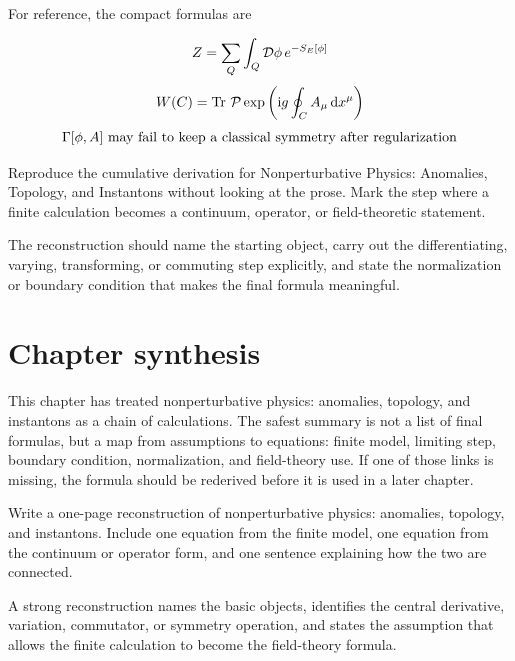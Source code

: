 For reference, the compact formulas are

\[
  Z=\sum_Q\int_Q\mathcal D\phi\,e^{-S_E[\phi]}
\]
\[
  W(C)=\operatorname{Tr}\,\mathcal P\exp\left(\mathrm i g\oint_C A_\mu\,\mathrm d x^\mu\right)
\]
\[
  \Gamma[\phi,A]\hbox{ may fail to keep a classical symmetry after regularization}
\]

\begin{exercise}
Reproduce the cumulative derivation for Nonperturbative Physics: Anomalies, Topology, and Instantons without looking at the prose.  Mark the step where a finite calculation becomes a continuum, operator, or field-theoretic statement.
\begin{answer}
The reconstruction should name the starting object, carry out the differentiating, varying, transforming, or commuting step explicitly, and state the normalization or boundary condition that makes the final formula meaningful.
\end{answer}
\end{exercise}



\section{Chapter synthesis}

This chapter has treated nonperturbative physics: anomalies, topology, and instantons as a chain of calculations.  The safest summary is not a list of final formulas, but a map from assumptions to equations: finite model, limiting step, boundary condition, normalization, and field-theory use.  If one of those links is missing, the formula should be rederived before it is used in a later chapter.

\begin{exercise}
Write a one-page reconstruction of nonperturbative physics: anomalies, topology, and instantons.  Include one equation from the finite model, one equation from the continuum or operator form, and one sentence explaining how the two are connected.
\begin{answer}
A strong reconstruction names the basic objects, identifies the central derivative, variation, commutator, or symmetry operation, and states the assumption that allows the finite calculation to become the field-theory formula.
\end{answer}
\end{exercise}
